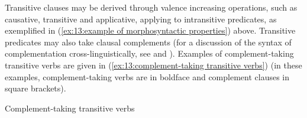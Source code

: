     \z
\z

Transitive clauses may be derived through valence increasing operations, such as causative, transitive and applicative, applying to intransitive predicates, as exemplified in (\ref{ex:13:example of morphosyntactic properties}) above. Transitive predicates may also take clausal complements (for a discussion of the syntax of complementation cross-linguistically, see \citealt{cristofaro2005subordination} and \citealt{noonan2007complementation}). Examples of complement-taking transitive verbs are given in (\ref{ex:13:complement-taking transitive verbs}) (in these examples, complement-taking verbs are in boldface and complement clauses in square brackets).


\ea\label{ex:13:complement-taking transitive verbs}
{Complement-taking transitive verbs}

